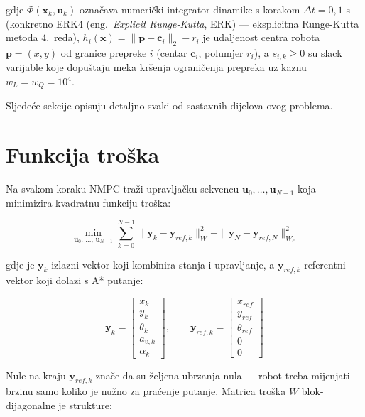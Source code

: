 gdje $\Phi(\mathbf{x}_k, \mathbf{u}_k)$ označava numerički integrator dinamike s korakom $\Delta t = 0{,}1$ s (konkretno ERK4 (eng.\ \textit{Explicit Runge-Kutta}, ERK) --- eksplicitna Runge-Kutta metoda 4.\ reda), $h_i(\mathbf{x}) = \|\mathbf{p} - \mathbf{c}_i\|_2 - r_i$ je udaljenost centra robota $\mathbf{p} = (x, y)$ od granice prepreke $i$ (centar $\mathbf{c}_i$, polumjer $r_i$), a $s_{i,k} \geq 0$ su slack varijable koje dopuštaju meka kršenja ograničenja prepreka uz kaznu $w_L = w_Q = 10^4$.

Sljedeće sekcije opisuju detaljno svaki od sastavnih dijelova ovog problema.

\section{Funkcija troška}

Na svakom koraku NMPC traži upravljačku sekvencu $\mathbf{u}_0, \ldots, \mathbf{u}_{N-1}$ koja minimizira kvadratnu funkciju troška:

\begin{equation}
  \min_{\mathbf{u}_0,\, \ldots,\, \mathbf{u}_{N-1}} \sum_{k=0}^{N-1} \|\mathbf{y}_k - \mathbf{y}_{ref,k}\|^2_W + \|\mathbf{y}_N - \mathbf{y}_{ref,N}\|^2_{W_e}
\end{equation}

gdje je $\mathbf{y}_k$ izlazni vektor koji kombinira stanja i upravljanje, a $\mathbf{y}_{ref,k}$ referentni vektor koji dolazi s A* putanje:

\begin{equation}
  \mathbf{y}_k = \begin{bmatrix} x_k \\ y_k \\ \theta_k \\ a_{v,k} \\ \alpha_k \end{bmatrix}, \qquad
  \mathbf{y}_{ref,k} = \begin{bmatrix} x_{ref} \\ y_{ref} \\ \theta_{ref} \\ 0 \\ 0 \end{bmatrix}
\end{equation}

Nule na kraju $\mathbf{y}_{ref,k}$ znače da su željena ubrzanja nula --- robot treba mijenjati brzinu samo koliko je nužno za praćenje putanje. Matrica troška $W$ blok-dijagonalne je strukture:

